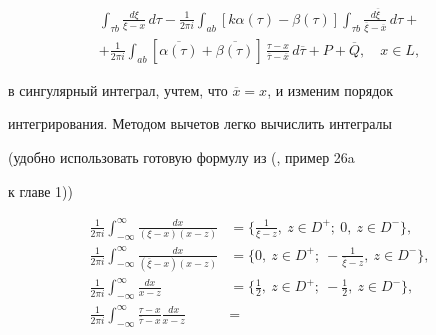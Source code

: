 \begin{pf}
\begin{multline}
\int_{\tau b}\frac{d\xi}{\xi-x}\,d\tau


- \frac{1}{2\pi i}\int_{ab}[k\alpha(\tau)-\beta(\tau)]


\int_{\tau b}\frac{d\overline{\xi}}{\overline{\xi}-\overline{x}}\,


d\tau + \\


%


+ \frac{1}{2\pi i}\int_{ab} [\overline{\alpha(\tau)}


+\overline{\beta(\tau)}]


\,\frac{\tau-x}{\overline{\tau}-\overline{x}}\,d\overline{\tau} +P


+\overline{Q},\quad x\in L,


\end{multline}


в сингулярный интеграл, учтем, что $\overline{x}=x$, и изменим порядок


интегрирования. Методом вычетов легко вычислить интегралы


(удобно использовать готовую формулу из (\cite{Gah.KZ.77}, пример 26a


к главе 1))


\begin{align*}


\frac{1}{2\pi i}\int_{-\infty}^{\infty}


\frac{dx}{(\xi-x)(x-z)} &=


\bigg\{ \frac{1}{\xi-z},\ z\in D^+;


\ 0,\ z\in D^- \bigg\}, \\


%


\frac{1}{2\pi i}\int_{-\infty}^{\infty}


\frac{dx}{(\overline{\xi}-x)(x-z)} &=


\bigg\{0,\ z\in D^+;


\ - \frac{1}{\overline{\xi}-z},\ z\in D^- \bigg\}, \\


%


\frac{1}{2\pi i}\int_{-\infty}^{\infty}


\frac{dx}{x-z} &=


\bigg\{ \frac{1}{2},\ z\in D^+;


\ -\frac{1}{2},\ z\in D^- \bigg\}, \\


%


\frac{1}{2\pi i}\int_{-\infty}^{\infty}


\frac{\tau-x}{\overline{\tau}-x}\frac{dx}{x-z} &=



\end{align*}
\end{pf}
